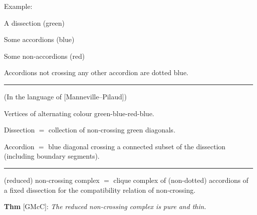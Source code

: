 \documentclass[portrait,final,a0paper,fontscale=0.25]{baposter}
\theoremstyle{definition}
\begin{document}
\begin{poster}
{\vspace*{-3cm}
\begin{minipage}{5.7cm}
Example:

\smallskip
\begin{compactitem}
 \item A dissection (green)
 \item Some accordions (blue)
 \item Some non-accordions (red)
\end{compactitem}

\medskip
Accordions not crossing any other accordion are dotted blue.
\end{minipage}


\vspace{.3cm}
\hspace{-.25cm}
{\color{blue} \rule{10.02cm}{1pt}}
\vspace{-.35cm}

(In the language of [Manneville--Pilaud])

\smallskip

Vertices of alternating colour green-blue-red-blue.

\smallskip

{\color{blue} Dissection} $=$ collection of non-crossing green diagonals.

\smallskip

{\color{blue} Accordion} $=$ blue diagonal crossing a connected subset of the dissection (including boundary segments).


\vspace{-.1cm}
\hspace{-.25cm}
{\color{blue} \rule{10.02cm}{1pt}}
\vspace{-.35cm}

{\color{blue} (reduced) non-crossing complex} $=$ clique complex of (non-dotted) accordions of a fixed dissection for the compatibility relation of non-crossing.

\smallskip

{\color{blue} \bf Thm} [GMcC]: {\it The reduced non-crossing complex is pure and thin.}


}

\end{poster}
\end{document}

